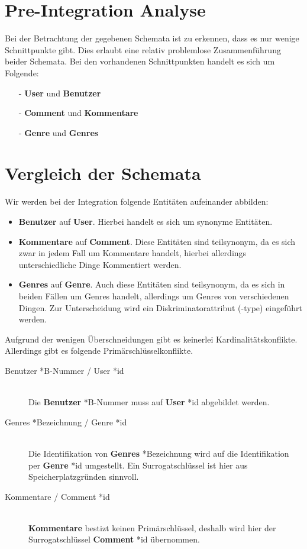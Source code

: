 \documentclass[11pt,a4paper,DIV=9]{scrartcl}
\begin{document}
\section{Pre-Integration Analyse}
  Bei der Betrachtung der gegebenen Schemata ist zu erkennen, dass es nur wenige Schnittpunkte gibt. Dies erlaubt eine relativ problemlose Zusammenführung beider Schemata.
  Bei den vorhandenen Schnittpunkten handelt es sich um Folgende:
  \begin{itemize}
    \item[-] \textbf{User} und \textbf{Benutzer}
    \item[-] \textbf{Comment} und \textbf{Kommentare}
    \item[-] \textbf{Genre} und \textbf{Genres}
  \end{itemize}

\section{Vergleich der Schemata}
  Wir werden bei der Integration folgende Entitäten aufeinander abbilden:
  \begin{itemize}
    \item \textbf{Benutzer} auf \textbf{User}. Hierbei handelt es sich um synonyme Entitäten.
    \item \textbf{Kommentare} auf \textbf{Comment}. Diese Entitäten sind teilsynonym, da es sich zwar in jedem Fall um Kommentare handelt, hierbei allerdings unterschiedliche Dinge Kommentiert werden.
    \item \textbf{Genres} auf \textbf{Genre}. Auch diese Entitäten sind teilsynonym, da es sich in beiden Fällen um Genres handelt, allerdings um Genres von verschiedenen Dingen. Zur Unterscheidung wird ein Diskriminatorattribut (-type) eingeführt werden. 
  \end{itemize}

  Aufgrund der wenigen Überschneidungen gibt es keinerlei Kardinalitätskonflikte. Allerdings gibt es folgende Primärschlüsselkonflikte.
  \begin{description}
    \item[Benutzer *B-Nummer / User *id] \hfill \\
      Die \textbf{Benutzer} *B-Nummer muss auf \textbf{User} *id abgebildet werden.
    \item[Genres *Bezeichnung / Genre *id] \hfill \\
      Die Identifikation von \textbf{Genres} *Bezeichnung wird auf die Identifikation per \textbf{Genre} *id umgestellt. Ein Surrogatschlüssel ist hier aus Speicherplatzgründen sinnvoll.
    \item[Kommentare / Comment *id] \hfill \\
      \textbf{Kommentare} bestizt keinen Primärschlüssel, deshalb wird hier der Surrogatschlüssel \textbf{Comment} *id übernommen.
  \end{description}
  
\end{document}
